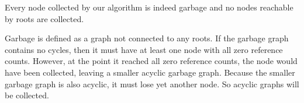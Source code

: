 \begin{theorem}[Safety]
Every node collected by our algorithm is indeed garbage and no nodes reachable by roots are collected.
\label{theorem:safety}
\end{theorem}
\begin{proofs}

Garbage is defined as a graph not connected to any roots. If the garbage graph contains
no cycles, then it must have at least one node with all zero reference counts. However,
at the point it reached all zero reference counts, the node would have been collected, leaving
a smaller acyclic garbage graph. Because the smaller garbage graph is also acyclic, it must lose
yet another node. So acyclic graphs will be collected.


\end{proofs}
